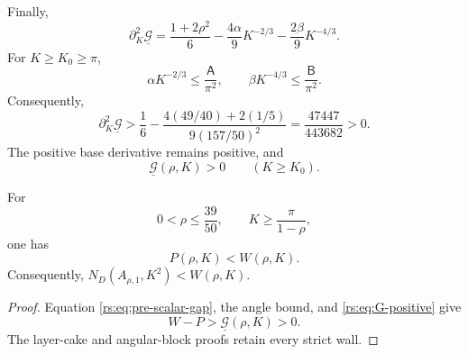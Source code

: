 Finally,
\begin{equation}
 \partial_K^2\underline{\mathcal G}
 =\frac{1+2\rho^2}{6}
 -\frac{4\alpha}{9}K^{-2/3}
 -\frac{2\beta}{9}K^{-4/3}.
 \label{rs:eq:G-K-convex}
\end{equation}
For $K\geq K_0\geq\pi$,
\[
 \alpha K^{-2/3}\leq\frac{\mathsf A}{\pi^2},
 \qquad
 \beta K^{-4/3}\leq\frac{\mathsf B}{\pi^2}.
\]
Consequently,
\begin{equation}
 \partial_K^2\underline{\mathcal G}
 >\frac16-
 \frac{4(49/40)+2(1/5)}{9(157/50)^2}
 =\frac{47447}{443682}>0.
 \label{rs:eq:G-K-positive}
\end{equation}
The positive base derivative remains positive, and
\begin{equation}
 \underline{\mathcal G}(\rho,K)>0
 \qquad(K\geq K_0).
 \label{rs:eq:G-positive}
\end{equation}

\begin{theorem}
\label{rs:thm:global-proxy}
For
\[
 0<\rho\leq\frac{39}{50},
 \qquad K\geq\frac\pi{1-\rho},
\]
one has
\begin{equation}
 P(\rho,K)<W(\rho,K).
 \label{rs:eq:proxy-conclusion}
\end{equation}
Consequently,
$N_D(A_{\rho,1},K^2)<W(\rho,K)$.
\end{theorem}

\begin{proof}
Equation \eqref{rs:eq:pre-scalar-gap}, the angle bound, and
\eqref{rs:eq:G-positive} give
\[
 W-P>\underline{\mathcal G}(\rho,K)>0.
\]
The layer-cake and angular-block proofs retain every strict wall.
\end{proof}
